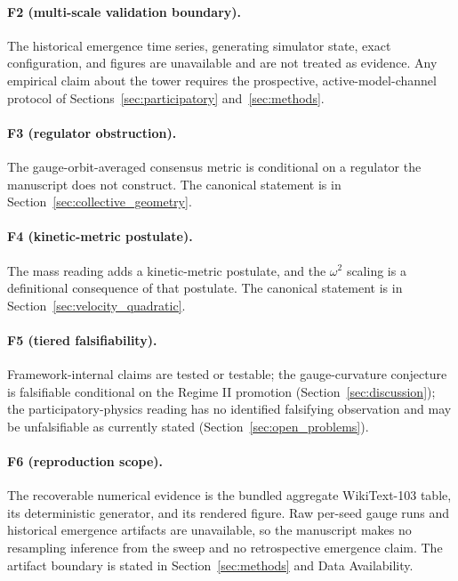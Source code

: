 \documentclass[11pt]{article}
\begin{document}
\paragraph{F2 (multi-scale validation boundary).} The historical emergence time series, generating simulator state, exact configuration, and figures are unavailable and are not treated as evidence. Any empirical claim about the tower requires the prospective, active-model-channel protocol of Sections~\ref{sec:participatory} and~\ref{sec:methods}.

\paragraph{F3 (regulator obstruction).} The gauge-orbit-averaged consensus metric is conditional on a regulator the manuscript does not construct. The canonical statement is in Section~\ref{sec:collective_geometry}.

\paragraph{F4 (kinetic-metric postulate).} The mass reading adds a kinetic-metric postulate, and the $\omega^2$ scaling is a definitional consequence of that postulate. The canonical statement is in Section~\ref{sec:velocity_quadratic}.

\paragraph{F5 (tiered falsifiability).} Framework-internal claims are tested or testable; the gauge-curvature conjecture is falsifiable conditional on the Regime II promotion (Section~\ref{sec:discussion}); the participatory-physics reading has no identified falsifying observation and may be unfalsifiable as currently stated (Section~\ref{sec:open_problems}).

\paragraph{F6 (reproduction scope).} The recoverable numerical evidence is the bundled aggregate WikiText-103 table, its deterministic generator, and its rendered figure. Raw per-seed gauge runs and historical emergence artifacts are unavailable, so the manuscript makes no resampling inference from the sweep and no retrospective emergence claim. The artifact boundary is stated in Section~\ref{sec:methods} and Data Availability.
\end{document}
